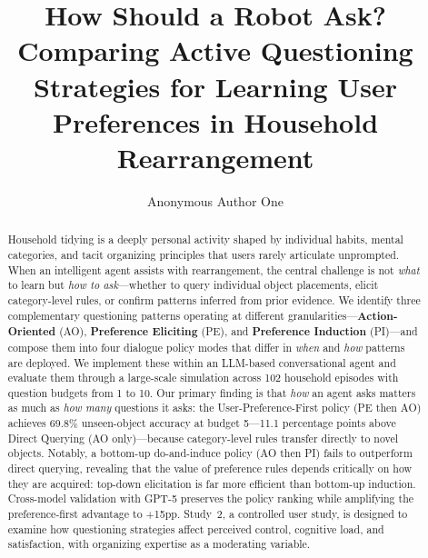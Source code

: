 \documentclass[a4paper,fleqn]{cas-sc}
\begin{document}
\let\WriteBookmarks\relax
\def\floatpagepagefraction{1}
\def\textpagefraction{.001}



\title[mode=title]{How Should a Robot Ask? Comparing Active Questioning Strategies for Learning User Preferences in Household Rearrangement}

\author[1]{Anonymous Author One}
\cormark[1]


\begin{abstract}
Household tidying is a deeply personal activity shaped by individual habits, mental categories, and tacit organizing principles that users rarely articulate unprompted. When an intelligent agent assists with rearrangement, the central challenge is not \emph{what} to learn but \emph{how to ask}---whether to query individual object placements, elicit category-level rules, or confirm patterns inferred from prior evidence. We identify three complementary questioning patterns operating at different granularities---\textbf{Action-Oriented} (AO), \textbf{Preference Eliciting} (PE), and \textbf{Preference Induction} (PI)---and compose them into four dialogue policy modes that differ in \emph{when} and \emph{how} patterns are deployed. We implement these within an LLM-based conversational agent and evaluate them through a large-scale simulation across 102 household episodes with question budgets from 1 to 10. Our primary finding is that \emph{how} an agent asks matters as much as \emph{how many} questions it asks: the User-Preference-First policy (PE then AO) achieves 69.8\% unseen-object accuracy at budget 5---11.1 percentage points above Direct Querying (AO only)---because category-level rules transfer directly to novel objects. Notably, a bottom-up do-and-induce policy (AO then PI) fails to outperform direct querying, revealing that the value of preference rules depends critically on how they are acquired: top-down elicitation is far more efficient than bottom-up induction. Cross-model validation with GPT-5 preserves the policy ranking while amplifying the preference-first advantage to +15pp. Study~2, a controlled user study, is designed to examine how questioning strategies affect perceived control, cognitive load, and satisfaction, with organizing expertise as a moderating variable.
\end{abstract}
\end{document}
